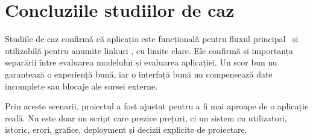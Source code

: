 \section{Concluziile studiilor de caz}
\label{sec:case-conclusions}

Studiile de caz confirmă că aplicația este funcțională pentru fluxul principal \autovit\ și utilizabilă pentru anumite linkuri \mobilede, cu limite clare. Ele confirmă și importanța separării între evaluarea modelului și evaluarea aplicației. Un scor bun nu garantează o experiență bună, iar o interfață bună nu compensează date incomplete sau blocaje ale sursei externe.

Prin aceste scenarii, proiectul a fost ajustat pentru a fi mai aproape de o aplicație reală. Nu este doar un script care prezice prețuri, ci un sistem cu utilizatori, istoric, erori, grafice, deployment și decizii explicite de proiectare.
